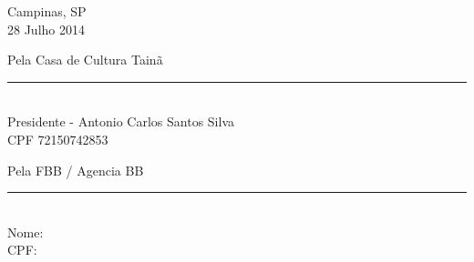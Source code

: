 \documentclass[a4paper, 11pt, oneside]{Relatorio_sem_2}  %
\begin{document}
\vfill



\vfill

Campinas, SP \\
28 Julho 2014

Pela Casa de Cultura Tainã

\begin{center}
\rule{15em}{0.5pt}\\
Presidente - Antonio Carlos Santos Silva\\
CPF 72150742853 
\end{center}

Pela FBB / Agencia BB

\begin{center}
\rule{15em}{0.5pt}\\
Nome: \ \ \ \ \ \ \ \ \ \ \ \ \ \ \ \ \ \ \ \ \ \ \ \ \ \ \ \ \ \ \ \ \ \\
CPF: \ \ \ \ \ \ \ \ \ \ \ \ \ \ \ \ \ \ \ \ \ \ \ \ \ \ \ \ \ \ \ \ \ \ 
\end{center}

\clearpage  %



\fancyhead{}  %
\rhead{\thepage}  %
\lhead{}  %

\pagestyle{fancy}  %




 
\end{document}
